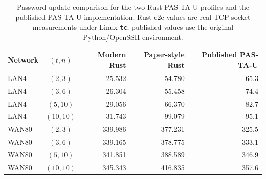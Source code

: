 \begin{table}[t]
\centering
\caption{Password-update comparison for the two Rust PAS-TA-U profiles and the published PAS-TA-U implementation. Rust e2e values are real TCP-socket measurements under Linux \texttt{tc}; published values use the original Python/OpenSSH environment.}
\label{tab:pastau-password-update-all-three}
\begin{tabular}{l c r r r}
\toprule
Network & $(t,n)$ & Modern Rust & Paper-style Rust & Published PAS-TA-U \\
\midrule
LAN4 & $(2,3)$ & 25.532 & 54.780 & 65.3 \\
LAN4 & $(3,6)$ & 26.304 & 55.458 & 74.4 \\
LAN4 & $(5,10)$ & 29.056 & 66.370 & 82.7 \\
LAN4 & $(10,10)$ & 31.743 & 99.079 & 95.1 \\
\midrule
WAN80 & $(2,3)$ & 339.986 & 377.231 & 325.5 \\
WAN80 & $(3,6)$ & 339.165 & 378.775 & 333.1 \\
WAN80 & $(5,10)$ & 341.851 & 388.589 & 346.9 \\
WAN80 & $(10,10)$ & 345.343 & 416.835 & 357.6 \\
\bottomrule
\end{tabular}
\end{table}
